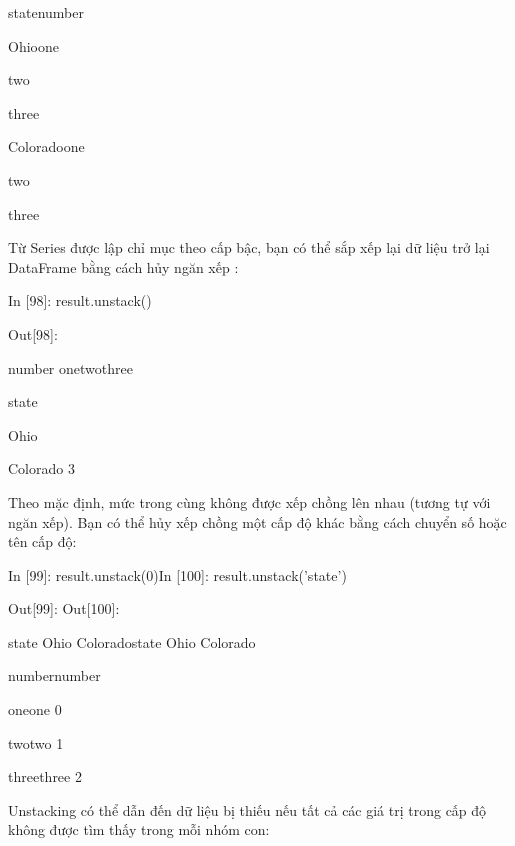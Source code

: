 \par\quad\textup state\quad\quad\quad\quad number
\par\quad\textup Ohio\quad\quad\quad\quad one\quad\quad\quad{}
\par\quad\textup \quad\quad\quad\quad\quad\quad two\quad\quad\qua\quadd\quad{}
\par\quad\textup\quad\quad\quad\quad\quad\quad three\quad\quad\quad\xspace 2
\par\quad\textup Colorado\quad\quad one\quad\quad\quad{}
\par\quad\textup\quad\quad\quad\quad\quad\quad  two\quad\quad\quad{}
\par\quad\textup\quad\quad\quad\quad\quad\quad  three\quad\quad{}
\par\quad\textup Từ Series được lập chỉ mục theo cấp bậc, bạn có thể sắp xếp lại dữ liệu trở lại DataFrame bằng cách hủy ngăn xếp :
\par\quad\textup In [98]: result.unstack()
\par\quad\textup Out[98]:
\par\quad\textup number one\quad two\quad three
\par\quad\textup state
\par\quad\textup Ohio\quad{}\quad{}\quad{}
\par\quad\textup Colorado 3\quad{}\quad{}
\par Theo mặc định, mức trong cùng không được xếp chồng lên nhau (tương tự với ngăn xếp). Bạn có thể hủy xếp chồng một cấp độ khác bằng cách chuyển số hoặc tên cấp độ:
\par\quad\textup In [99]: result.unstack(0)\quad\quad In [100]: result.unstack('state')
\par\quad\textup Out[99]:\quad\quad\quad\quad\quad\quad\quad\quad\xspace Out[100]:
\par\quad\textup state Ohio Colorado\quad\quad\quad\quad state Ohio Colorado
\par\quad\textup number\quad\quad\quad\quad\quad\quad\quad\quad\quad number
\par\quad\textup one\quad{}\quad\quad\quad\quad\quad\quad\quad one 0
\par\quad\textup two\quad{}\quad\quad\quad\quad\quad\quad\quad two 1
\par\quad\textup three\quad\quad\quad\quad\quad\quad\quad three 2
\par Unstacking có thể dẫn đến dữ liệu bị thiếu nếu tất cả các giá trị trong cấp độ không được tìm thấy trong mỗi nhóm con:
